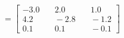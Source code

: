 \documentclass[preview]{standalone}
\begin{document}
\begin{align*}
=\begin{bmatrix} -3.0 & \quad 2.0 & \quad 1.0 \\ 4.2 & \quad -2.8 & \quad -1.2 \\ 0.1 & \quad 0.1 & \quad -0.1 \end{bmatrix}
\end{align*}
\end{document}
